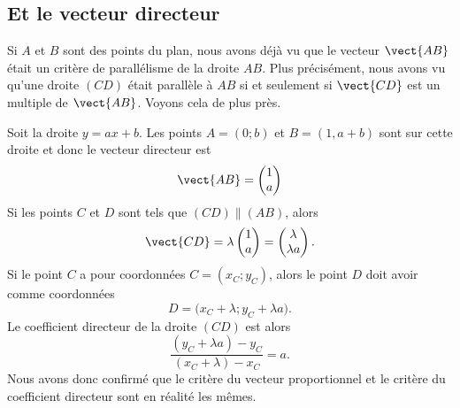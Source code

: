 \subsection{Et le vecteur directeur}

Si \( A\) et \( B\) sont des points du plan, nous avons déjà vu que le vecteur \( \vect{ AB }\) était un critère de parallélisme de la droite \( AB\). Plus précisément, nous avons vu qu'une droite \( (CD)\) était parallèle à \( AB\) si et seulement si \( \vect{ CD }\) est un multiple de \( \vect{ AB }\). Voyons cela de plus près.

Soit la droite \( y=ax+b\). Les points \( A=(0;b)\) et \( B=(1,a+b)\) sont sur cette droite et donc le vecteur directeur est
\begin{equation}
    \vect{ AB }=\begin{pmatrix}
        1    \\ 
        a    
    \end{pmatrix}
\end{equation}
Si les points \( C\) et \( D\) sont tels que \( (CD)\parallel (AB)\), alors
\begin{equation}
    \vect{ CD }=\lambda\begin{pmatrix}
        1    \\ 
        a    
    \end{pmatrix}=\begin{pmatrix}
        \lambda    \\ 
            \lambda a
    \end{pmatrix}.
\end{equation}
Si le point \( C\) a pour coordonnées \( C=(x_C;y_C)\), alors le point \( D\) doit avoir comme coordonnées
\begin{equation}
    D=\big( x_C+\lambda;y_C+\lambda a \big).
\end{equation}
Le coefficient directeur de la droite \( (CD)\) est alors
\begin{equation}
    \frac{ (y_C+\lambda a)-y_C }{ (x_C+\lambda)-x_C }=a.
\end{equation}
Nous avons donc confirmé que le critère du vecteur proportionnel et le critère du coefficient directeur sont en réalité les mêmes.

